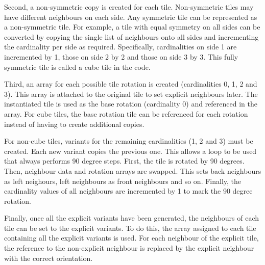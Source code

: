 Second, a non-symmetric copy is created for each tile. Non-symmetric tiles may have different neighbours on each side. Any symmetric tile can be represented as a non-symmetric tile. For example, a tile with equal symmetry on all sides can be converted by copying the single list of neighbours onto all sides and incrementing the cardinality per side as required. Specifically, cardinalities on side 1 are incremented by 1, those on side 2 by 2 and those on side 3 by 3. This fully symmetric tile is called a cube tile in the code.


Third, an array for each possible tile rotation is created (cardinalities 0, 1, 2 and 3). This array is attached to the original tile to set explicit neighbours later. The instantiated tile is used as the base rotation (cardinality 0) and referenced in the array. For cube tiles, the base rotation tile can be referenced for each rotation instead of having to create additional copies.


For non-cube tiles, variants for the remaining cardinalities (1, 2 and 3) must be created. Each new variant copies the previous one. This allows a loop to be used that always performs 90 degree steps. First, the tile is rotated by 90 degrees. Then, neighbour data and rotation arrays are swapped. This sets back neighbours as left neighours, left neighbours as front neighbours and so on. Finally, the cardinality values of all neighbours are incremented by 1 to mark the 90 degree rotation.


Finally, once all the explicit variants have been generated, the neighbours of each tile can be set to the explicit variants. To do this, the array assigned to each tile containing all the explicit variants is used. For each neighbour of the explicit tile, the reference to the non-explicit neighbour is replaced by the explicit neighbour with the correct orientation.


